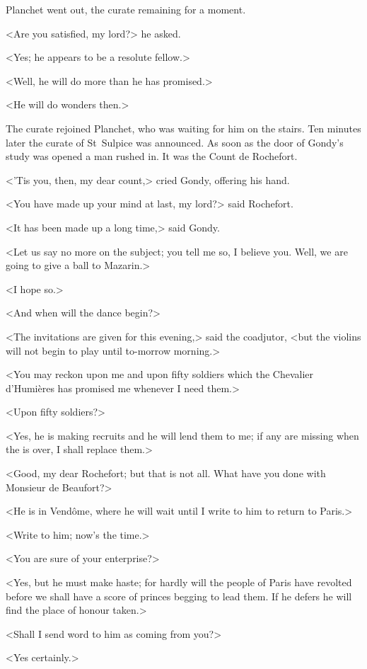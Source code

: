 Planchet went out, the curate remaining for a moment.

<Are you satisfied, my lord?> he asked.

<Yes; he appears to be a resolute fellow.>

<Well, he will do more than he has promised.>

<He will do wonders then.>

The curate rejoined Planchet, who was waiting for him on the stairs. Ten minutes later the curate of St~Sulpice was announced. As soon as the door of Gondy's study was opened a man rushed in. It was the Count de Rochefort.

<'Tis you, then, my dear count,> cried Gondy, offering his hand.

<You have made up your mind at last, my lord?> said Rochefort.

<It has been made up a long time,> said Gondy.

<Let us say no more on the subject; you tell me so, I believe you. Well, we are going to give a ball to Mazarin.>

<I hope so.>

<And when will the dance begin?>

<The invitations are given for this evening,> said the coadjutor, <but the violins will not begin to play until to-morrow morning.>

<You may reckon upon me and upon fifty soldiers which the Chevalier d'Humières has promised me whenever I need them.>

<Upon fifty soldiers?>

<Yes, he is making recruits and he will lend them to me; if any are missing when the  is over, I shall replace them.>

<Good, my dear Rochefort; but that is not all. What have you done with Monsieur de Beaufort?>

<He is in Vendôme, where he will wait until I write to him to return to Paris.>

<Write to him; now's the time.>

<You are sure of your enterprise?>

<Yes, but he must make haste; for hardly will the people of Paris have revolted before we shall have a score of princes begging to lead them. If he defers he will find the place of honour taken.>

<Shall I send word to him as coming from you?>

<Yes certainly.>

